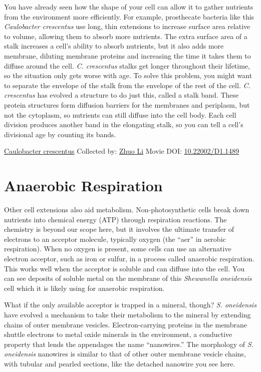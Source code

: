 \documentclass[]{tufte-book}
\begin{document}
You have already seen how the shape of your cell can allow it to gather nutrients from the environment more efficiently. For example, prosthecate bacteria like this \emph{Caulobacter crescentus} use long, thin extensions to increase surface area relative to volume, allowing them to absorb more nutrients. The extra surface area of a stalk increases a cell's ability to absorb nutrients, but it also adds more membrane, diluting membrane proteins and increasing the time it takes them to diffuse around the cell. \emph{C. crescentus} stalks get longer throughout their lifetime, so the situation only gets worse with age. To solve this problem, you might want to separate the envelope of the stalk from the envelope of the rest of the cell. \emph{C. crescentus} has evolved a structure to do just this, called a stalk band. These protein structures form diffusion barriers for the membranes and periplasm, but not the cytoplasm, so nutrients can still diffuse into the cell body. Each cell division produces another band in the elongating stalk, so you can tell a cell's divisional age by counting its bands.



\hypertarget{htmlwidget-2117cf56dd2436beadd9}{}

\label{fig:4-1}\protect\hyperlink{tree}{Caulobacter crescentus} Collected by: \protect\hyperlink{zhuo_li}{Zhuo Li} Movie DOI: \href{https://doi.org/10.22002/D1.1489}{10.22002/D1.1489}

\hypertarget{anaerobic-respiration}{%
\section{Anaerobic Respiration}\label{anaerobic-respiration}}

Other cell extensions also aid metabolism. Non-photosynthetic cells break down nutrients into chemical energy (ATP) through respiration reactions. The chemistry is beyond our scope here, but it involves the ultimate transfer of electrons to an acceptor molecule, typically oxygen (the ``aer'' in aerobic respiration). When no oxygen is present, some cells can use an alternative electron acceptor, such as iron or sulfur, in a process called anaerobic respiration. This works well when the acceptor is soluble and can diffuse into the cell. You can see deposits of soluble metal on the membrane of this \emph{Shewanella oneidensis} cell which it is likely using for anaerobic respiration.

What if the only available acceptor is trapped in a mineral, though? \emph{S. oneidensis} have evolved a mechanism to take their metabolism to the mineral by extending chains of outer membrane vesicles. Electron-carrying proteins in the membrane shuttle electrons to metal oxide minerals in the environment, a conductive property that lends the appendages the name ``nanowires.'' The morphology of \emph{S. oneidensis} nanowires is similar to that of other outer membrane vesicle chains, with tubular and pearled sections, like the detached nanowire you see here.
\end{document}

